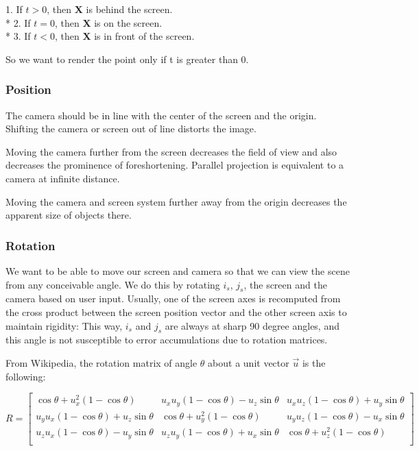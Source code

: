 \documentclass[12pt]{article}
\begin{document}
		1. If $t > 0$, then \textbf{X} is behind the screen. \\*
		2. If $t = 0$, then \textbf{X} is on the screen. \\*
		3. If $t < 0$, then \textbf{X} is in front of the screen.

	So we want to render the point only if t is greater than 0.

	\subsubsection*{Position}
	
	The camera should be in line with the center of the screen and the origin. Shifting the camera or screen out of line distorts the image.
	
	Moving the camera further from the screen decreases the field of view and also decreases the prominence of foreshortening. Parallel projection is equivalent to a camera at infinite distance.
	
	Moving the camera and screen system further away from the origin decreases the apparent size of objects there.

	\subsubsection*{Rotation}
	
	We want to be able to move our screen and camera so that we can view the scene from any conceivable angle. We do this by rotating $i_{s}$, $j_{s}$, the screen and the camera based on user input. Usually, one of the screen axes is recomputed from the cross product between the screen position vector and the other screen axis to maintain rigidity: This way, $i_{s}$ and $j_{s}$ are always at sharp 90 degree angles, and this angle is not susceptible to error accumulations due to rotation matrices.
	
	From Wikipedia, the rotation matrix of angle $\theta$ about a unit vector $\vec{u}$ is the following:
	

		\[R = \begin{bmatrix}
			\cos\theta + u_{x}^{2}(1-\cos\theta) & 
			u_{x}u_{y}(1-\cos\theta) - u_{z}\sin\theta & 
			u_{x}u_{z}(1-\cos\theta) + u_{y}\sin\theta \\
			
			u_{y}u_{x}(1-\cos\theta) + u_{z}\sin\theta &			
			\cos\theta + u_{y}^{2}(1-\cos\theta) &
			u_{y}u_{z}(1-\cos\theta) - u_{x}\sin\theta \\
			
						 
			u_{z}u_{x}(1-\cos\theta) - u_{y}\sin\theta & 
			u_{z}u_{y}(1-\cos\theta) + u_{x}\sin\theta &
			\cos\theta + u_{z}^{2}(1-\cos\theta) \\
			
		\end{bmatrix}\]	
		
\end{document}
